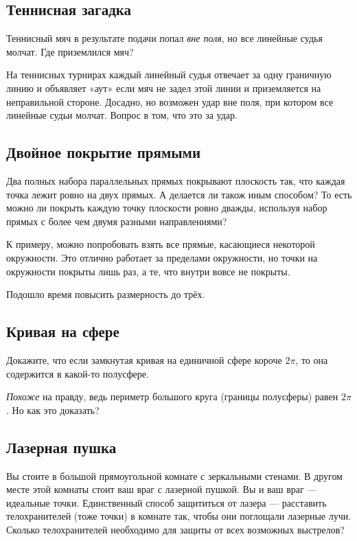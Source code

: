 \subsection*{Теннисная загадка}

Теннисный мяч в результате подачи попал \emph{вне поля}, но все линейные судья молчат.
Где приземлился мяч?

На теннисных турнирах каждый линейный судья отвечает за одну граничную линию и объявляет «аут» если мяч не задел этой линии и приземляется на неправильной стороне.
Досадно, но возможен удар вне поля, при котором все линейные судьи молчат.
Вопрос в том, что это за удар.

\subsection*{Двойное покрытие прямыми}

Два полных набора параллельных прямых покрывают плоскость так, что каждая точка лежит ровно на двух прямых.
А делается ли також иным способом?
То есть можно ли покрыть каждую точку плоскости ровно дважды, используя набор прямых с более чем двумя разными направлениями?

 К примеру, можно попробовать взять все прямые, касающиеся некоторой окружности.
Это отлично работает за пределами окружности, но точки на окружности покрыты лишь раз, а те, что внутри вовсе не покрыты.

\medskip

Подошло время повысить размерность до трёх.

\subsection*{Кривая на сфере}

Докажите, что если замкнутая кривая на единичной сфере короче $2\pi$, то она содержится в какой-то полусфере.

 \emph{Похоже} на правду, ведь периметр большого круга (границы полусферы) равен $2\pi$.
Но как это доказать?

\subsection*{Лазерная пушка}

Вы стоите в большой прямоугольной комнате с зеркальными стенами.
В другом месте этой комнаты стоит ваш враг с лазерной пушкой.
Вы и ваш враг --- идеальные точки.
Единственный способ защититься от лазера --- расставить телохранителей (тоже точки) в комнате так, чтобы они поглощали лазерные лучи.
Сколько телохранителей необходимо для защиты от всех возможных выстрелов?

